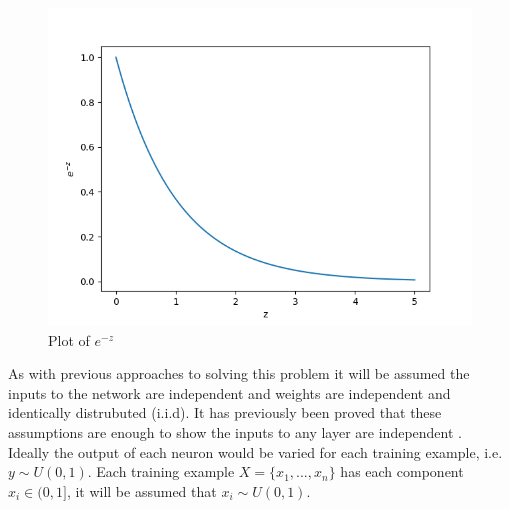 \begin{minipage}[t]{0.4\textwidth}
\vspace{0px}
\begin{figure}[H]
\vspace{0px}
    \includegraphics[width=\textwidth]{activation-plot.png}
    \caption{Plot of $e^{-z}$}
    \label{fig:activation-plot}
\end{figure}
\end{minipage}

As with previous approaches to solving this problem it will be assumed the inputs to the network are independent and weights are independent and identically distrubuted (i.i.d). It has previously been proved that these assumptions are enough to show the inputs to any layer are independent \cite{kumar2017weight}.\\

Ideally the output of each neuron would be varied for each training example, i.e. $y \sim U(0,1)$. Each training example $X = \{x_1, ..., x_n\}$ has each component $x_i \in (0,1]$, it will be assumed that $x_i \sim U(0,1)$. 

